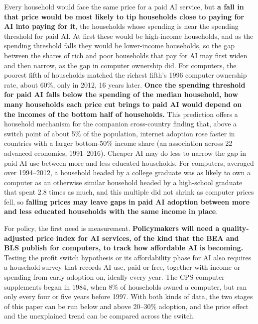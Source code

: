 \documentclass[11pt]{article}
\begin{document}
Every household would face the same price for a paid AI service, but \textbf{a fall in that price would be most likely to tip households close to paying for AI into paying for it}, the households whose spending is near the spending threshold for paid AI. At first these would be high-income households, and as the spending threshold falls they would be lower-income households, so the gap between the shares of rich and poor households that pay for AI may first widen and then narrow, as the gap in computer ownership did. For computers, the poorest fifth of households matched the richest fifth's 1996 computer ownership rate, about 60\%, only in 2012, 16 years later. \textbf{Once the spending threshold for paid AI falls below the spending of the median household, how many households each price cut brings to paid AI would depend on the incomes of the bottom half of households.} This prediction offers a household mechanism for the companion cross-country finding that, above a switch point of about 5\% of the population, internet adoption rose faster in countries with a larger bottom-50\% income share (an association across 22 advanced economies, 1991--2016). Cheaper AI may do less to narrow the gap in paid AI use between more and less educated households. For computers, averaged over 1994--2012, a household headed by a college graduate was as likely to own a computer as an otherwise similar household headed by a high-school graduate that spent 2.8 times as much, and this multiple did not shrink as computer prices fell, so \textbf{falling prices may leave gaps in paid AI adoption between more and less educated households with the same income in place}.

For policy, the first need is measurement. \textbf{Policymakers will need a quality-adjusted price index for AI services, of the kind that the BEA and BLS publish for computers, to track how affordable AI is becoming.} Testing the profit switch hypothesis or its affordability phase for AI also requires a household survey that records AI use, paid or free, together with income or spending from early adoption on, ideally every year. The CPS computer supplements began in 1984, when 8\% of households owned a computer, but ran only every four or five years before 1997. With both kinds of data, the two stages of this paper can be run below and above 20--30\% adoption, and the price effect and the unexplained trend can be compared across the switch.
\end{document}
